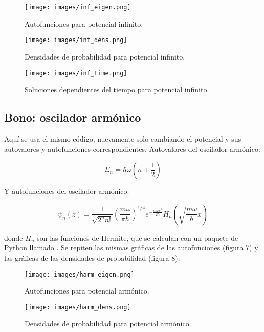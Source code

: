 \documentclass{article}
\begin{document}
\begin{figure}
    \texttt{[image: images/inf\_eigen.png]}
    \centering
    \caption{Autofunciones para potencial infinito.}
\end{figure}

\begin{figure}
    \texttt{[image: images/inf\_dens.png]}
    \centering
    \caption{Densidades de probabilidad para potencial infinito.}
\end{figure}

\begin{figure}
    \texttt{[image: images/inf\_time.png]}
    \centering
    \caption{Soluciones dependientes del tiempo para potencial infinito.}
\end{figure}

\subsection{Bono: oscilador armónico}

Aquí se usa el mismo código, nuevamente solo cambiando el potencial y sus autovalores y autofunciones correspondientes. Autovalores del oscilador armónico:

\begin{equation}
    E_n=\hbar\omega(n+\frac{1}{2})
\end{equation}

Y autofunciones del oscilador armónico:

\begin{equation}
    \psi_n(z)=\frac{1}{\sqrt{2^nn!}}\left(\frac{m\omega}{\pi\hbar}\right)^{1/4}e^{-\frac{m\omega x^2}{2\hbar}}H_n\left(\sqrt{\frac{m\omega}{\hbar}x}\right)
\end{equation}

donde $H_n$ son las funciones de Hermite, que se calculan con un paquete de Python llamado . Se repiten las mismas gráficas de las autofunciones (figura 7) y las gráficas de las densidades de probabilidad (figura 8):

\begin{figure}
    \texttt{[image: images/harm\_eigen.png]}
    \centering
    \caption{Autofunciones para potencial armónico.}
\end{figure}

\begin{figure}
    \texttt{[image: images/harm\_dens.png]}
    \centering
    \caption{Densidades de probabilidad para potencial armónico.}
\end{figure}
\end{document}
